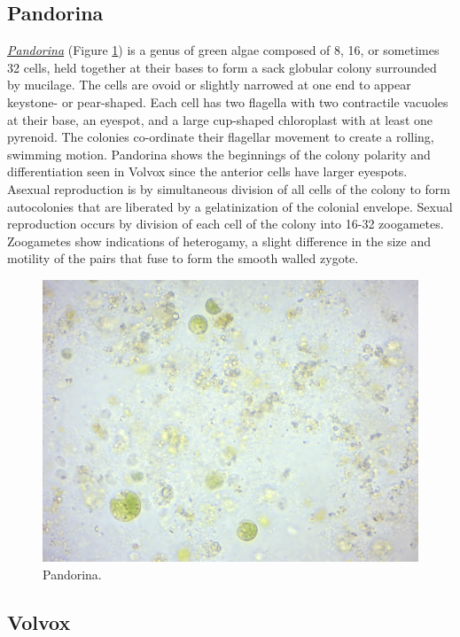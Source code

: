 \subsection{Pandorina}\label{pandorina}

\href{https://en.wikipedia.org/wiki/Pandorina}{\emph{Pandorina}} (Figure
\ref{fig:pandorina}) is a genus of green algae composed of 8, 16, or
sometimes 32 cells, held together at their bases to form a sack globular
colony surrounded by mucilage. The cells are ovoid or slightly narrowed
at one end to appear keystone- or pear-shaped. Each cell has two
flagella with two contractile vacuoles at their base, an eyespot, and a
large cup-shaped chloroplast with at least one pyrenoid. The colonies
co-ordinate their flagellar movement to create a rolling, swimming
motion. Pandorina shows the beginnings of the colony polarity and
differentiation seen in Volvox since the anterior cells have larger
eyespots. Asexual reproduction is by simultaneous division of all cells
of the colony to form autocolonies that are liberated by a
gelatinization of the colonial envelope. Sexual reproduction occurs by
division of each cell of the colony into 16-32 zoogametes. Zoogametes
show indications of heterogamy, a slight difference in the size and
motility of the pairs that fuse to form the smooth walled zygote.

\begin{figure}

{\centering \includegraphics[width=0.7\linewidth]{./figures/protists/Pandorina}

}

\caption{Pandorina.}\label{fig:pandorina}
\end{figure}

\subsection{Volvox}\label{volvox}

